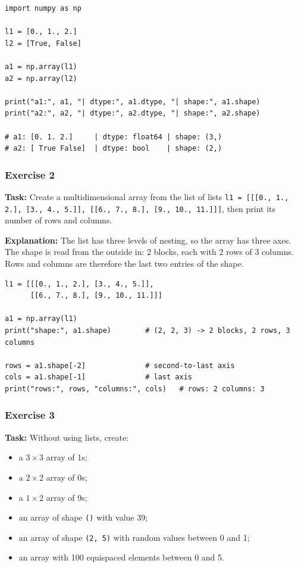 \begin{lstlisting}[caption={Creating arrays from lists and checking dtype and shape.}]
import numpy as np

l1 = [0., 1., 2.]
l2 = [True, False]

a1 = np.array(l1)
a2 = np.array(l2)

print("a1:", a1, "| dtype:", a1.dtype, "| shape:", a1.shape)
print("a2:", a2, "| dtype:", a2.dtype, "| shape:", a2.shape)

# a1: [0. 1. 2.]     | dtype: float64 | shape: (3,)
# a2: [ True False]  | dtype: bool    | shape: (2,)
\end{lstlisting}

\subsubsection{Exercise 2}
\textbf{Task:} Create a multidimensional array from the list of lists \texttt{l1 = [[[0., 1., 2.], [3., 4., 5.]], [[6., 7., 8.], [9., 10., 11.]]]}, then print its number of rows and columns.

\textbf{Explanation:} The list has three levels of nesting, so the array has three axes. The shape is read from the outside in: 2 blocks, each with 2 rows of 3 columns. Rows and columns are therefore the last two entries of the shape.

\begin{lstlisting}[caption={A 3-D array and its shape.}]
l1 = [[[0., 1., 2.], [3., 4., 5.]],
      [[6., 7., 8.], [9., 10., 11.]]]

a1 = np.array(l1)
print("shape:", a1.shape)        # (2, 2, 3) -> 2 blocks, 2 rows, 3 columns

rows = a1.shape[-2]              # second-to-last axis
cols = a1.shape[-1]              # last axis
print("rows:", rows, "columns:", cols)   # rows: 2 columns: 3
\end{lstlisting}

\subsubsection{Exercise 3}
\textbf{Task:} Without using lists, create:
\begin{itemize}
    \item a $3 \times 3$ array of 1s;
    \item a $2 \times 2$ array of 0s;
    \item a $1 \times 2$ array of 9s;
    \item an array of shape \texttt{()} with value 39;
    \item an array of shape \texttt{(2, 5)} with random values between 0 and 1;
    \item an array with 100 equispaced elements between 0 and 5.
\end{itemize}

